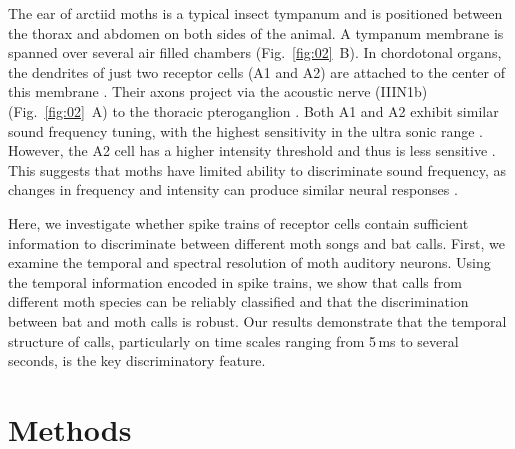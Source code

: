 \documentclass[12pt,a4paper]{article}
\newcommand{\fig}[2]{(Fig.~#1~#2)}
\begin{document}
The ear of arctiid moths is a typical insect tympanum \parencite{miller_how_2001, yack_structure_2004} and is positioned between the thorax and abdomen on both sides of the animal. A tympanum membrane is spanned over several air filled chambers \fig{\ref{fig:02}}{B}. In chordotonal organs, the dendrites of just two receptor cells (A1 and A2) are attached to the center of this membrane \parencite{yager_structure_1999}. Their axons project via the acoustic nerve (IIIN1b) \fig{\ref{fig:02}}{A} to the thoracic pteroganglion \parencite{paul_central_1973}. Both A1 and A2 exhibit similar sound frequency tuning, with the highest sensitivity in the ultra sonic range \parencite{fullard_intensity_1998, yager_structure_1999, terhofstede_simple_2013, nakano_moth_2014}. However, the A2 cell has a higher intensity threshold and thus is less sensitive \parencite{miller_how_2001}. This suggests that moths have limited ability to discriminate sound frequency, as changes in frequency and intensity can produce similar neural responses \parencite{roeder_auditory_1966, terhofstede_simple_2013}.


Here, we investigate whether spike trains of receptor cells contain sufficient information to discriminate between different moth songs and bat calls. First, we examine the temporal and spectral resolution of moth auditory neurons. Using the temporal information encoded in spike trains, we show that calls from different moth species can be reliably classified and that the discrimination between bat and moth calls is robust. Our results demonstrate that the temporal structure of calls, particularly on time scales ranging from 5\,ms to several seconds, is the key discriminatory feature.

\newpage

\section{Methods}
\end{document}
